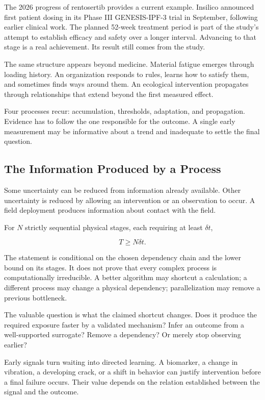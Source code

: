 The 2026 progress of rentosertib provides a current example. Insilico announced first patient dosing in its Phase III GENESIS-IPF-3 trial in September, following earlier clinical work. The planned 52-week treatment period is part of the study's attempt to establish efficacy and safety over a longer interval.\cite{insilico2026phase3} Advancing to that stage is a real achievement. Its result still comes from the study.

The same structure appears beyond medicine. Material fatigue emerges through loading history. An organization responds to rules, learns how to satisfy them, and sometimes finds ways around them. An ecological intervention propagates through relationships that extend beyond the first measured effect.

Four processes recur: accumulation, thresholds, adaptation, and propagation. Evidence has to follow the one responsible for the outcome. A single early measurement may be informative about a trend and inadequate to settle the final question.

\subsection{The Information Produced by a Process}

Some uncertainty can be reduced from information already available. Other uncertainty is reduced by allowing an intervention or an observation to occur. A field deployment produces information about contact with the field.

For $N$ strictly sequential physical stages, each requiring at least $\delta t$,

\begin{equation}
T\geq N\delta t.
\label{eq:steps}
\end{equation}

The statement is conditional on the chosen dependency chain and the lower bound on its stages. It does not prove that every complex process is computationally irreducible. A better algorithm may shortcut a calculation; a different process may change a physical dependency; parallelization may remove a previous bottleneck.

The valuable question is what the claimed shortcut changes. Does it produce the required exposure faster by a validated mechanism? Infer an outcome from a well-supported surrogate? Remove a dependency? Or merely stop observing earlier?

Early signals turn waiting into directed learning. A biomarker, a change in vibration, a developing crack, or a shift in behavior can justify intervention before a final failure occurs. Their value depends on the relation established between the signal and the outcome.

